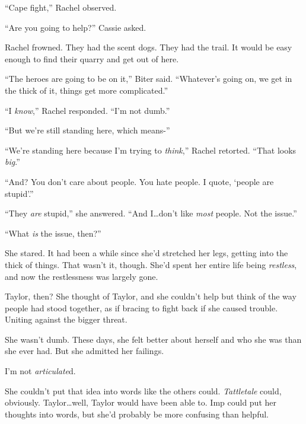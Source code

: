 ``Cape fight,'' Rachel observed.



``Are you going to help?'' Cassie asked.



Rachel frowned.  They had the scent dogs.  They had the trail.  It would be easy enough to find their quarry and get out of here.



``The heroes are going to be on it,'' Biter said.  ``Whatever's going on, we get in the thick of it, things get more complicated.''



``I \emph{know},'' Rachel responded.  ``I'm not dumb.''



``But we're still standing here, which means-''



``We're standing here because I'm trying to \emph{think},'' Rachel retorted.  ``That looks \emph{big}.''



``And?  You don't care about people.  You hate people.  I quote, `people are stupid'.''



``They \emph{are} stupid,'' she answered.  ``And I\ldots don't like \emph{most} people.  Not the issue.''



``What \emph{is} the issue, then?''



She stared.  It had been a while since she'd stretched her legs, getting into the thick of things.  That wasn't it, though.  She'd spent her entire life being \emph{restless}, and now the restlessness was largely gone.



Taylor, then?  She thought of Taylor, and she couldn't help but think of the way people had stood together, as if bracing to fight back if she caused trouble.  Uniting against the bigger threat.



She wasn't dumb.  These days, she felt better about herself and who she was than she ever had.  But she admitted her failings.



I'm not \emph{articulate}d.



She couldn't put that idea into words like the others could.  \emph{Tattletale} could, obviously.  Taylor\ldots well, Taylor would have been able to.  Imp could put her thoughts into words, but she'd probably be more confusing than helpful.



